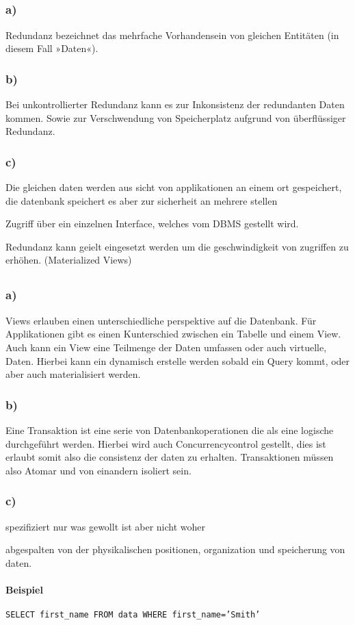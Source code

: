 \documentclass[12pt,a4paper,DIV=9]{scrartcl}
\newcounter{temp}
\newcommand{\aufgabe}[1]{
  \setcounter{temp}{\value{subsection}}
  \setcounter{subsection}{#1}
  \addtocounter{subsection}{-1}
  \subsection{}
  \setcounter{subsection}{\value{temp}}
}
\newcommand{\teil}[2][]{
  \subsubsection*{#2) #1}
}
\begin{document}
\aufgabe{3}
\teil{a}
  Redundanz bezeichnet das mehrfache Vorhandensein von gleichen Entitäten (in diesem Fall »Daten«).
\teil{b}
  Bei unkontrollierter Redundanz kann es zur Inkonsistenz der redundanten Daten kommen. Sowie zur Verschwendung von Speicherplatz aufgrund von überflüssiger Redundanz.

\teil{c}
  Die gleichen daten werden aus sicht von applikationen an einem ort gespeichert, die datenbank speichert es aber zur sicherheit an mehrere stellen

  Zugriff über ein einzelnen Interface, welches vom DBMS gestellt wird.

  Redundanz kann geielt eingesetzt werden um die geschwindigkeit von zugriffen zu erhöhen. (Materialized Views)

\aufgabe{4}
\teil{a}
  Views erlauben  einen unterschiedliche perspektive auf die Datenbank.  Für Applikationen gibt es einen Kunterschied zwischen ein Tabelle und einem View. Auch kann ein View eine Teilmenge  der Daten umfassen oder auch virtuelle, Daten.  Hierbei kann ein dynamisch erstelle werden sobald ein Query kommt, oder aber auch materialisiert werden.

\teil{b}
  Eine Transaktion ist eine serie von Datenbankoperationen die als eine logische durchgeführt werden. Hierbei wird auch Concurrencycontrol gestellt, dies ist  erlaubt somit also die consistenz der daten zu erhalten. Transaktionen müssen also Atomar und von einandern isoliert sein.

\teil{c}
  spezifiziert nur was gewollt ist aber nicht woher

  abgespalten von der physikalischen positionen, organization und speicherung von daten.

\paragraph{Beispiel} \texttt{SELECT first\_name FROM data WHERE first\_name='Smith'}
\end{document}
